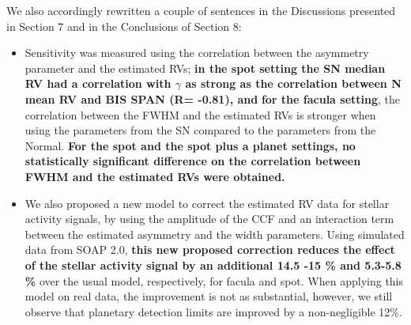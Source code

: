 \documentclass[11pt]{article}   	%
\begin{document}
\begin{enumerate}
We also accordingly rewritten a couple of sentences in the Discussions presented in Section 7 and in the Conclusions of Section 8:
\begin{itemize}
\item Sensitivity was measured using the correlation between the asymmetry parameter and the estimated RVs; {\bf{in the spot setting the SN median RV had a correlation with $\gamma$ as strong as the correlation between N mean RV and BIS SPAN (R= -0.81), and}}
{\bf{for the facula setting}}, the correlation between the FWHM and the estimated RVs is stronger when using the parameters from the SN compared to the parameters from the Normal. {\bf{For the spot and the spot plus a planet settings, no statistically significant difference on the correlation between FWHM and the estimated RVs were obtained.}}

\item We also proposed a new model to correct the estimated RV data for stellar activity signals, by using the amplitude of the CCF and an interaction term between the estimated asymmetry and the width parameters. Using simulated data from SOAP 2.0, {\bf{this new proposed correction reduces the effect of the stellar activity signal by an additional 14.5 -15 \% and 5.3-5.8 \%}} over the usual model, respectively, for facula and spot. When applying this model on real data, the improvement is not as substantial, however, we still observe that planetary detection limits are improved by a non-negligible 12\%.
\end{itemize}


\end{enumerate}
\end{document}

